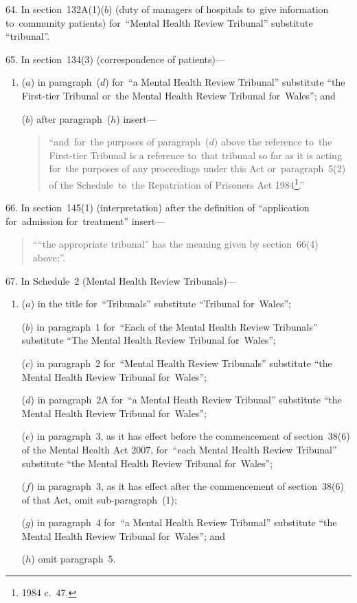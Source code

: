 \documentclass[12pt,a4paper]{article}
\begin{document}
\medskip

64.  In section~132A(1)($b$)  (duty of managers of hospitals to~give information to~community patients) for~“Mental Health Review Tribunal” substitute “tribunal”.

\medskip

65.  In section~134(3) (correspondence of patients)—
\begin{enumerate}\item[]
($a$) in paragraph~($d$)  for~“a Mental Health Review Tribunal” substitute “the First-tier Tribunal or~the Mental Health Review Tribunal for~Wales”; and

($b$) after paragraph~($h$)  insert—
\begin{quotation}
“and~for~the purposes of paragraph~($d$)  above the reference to~the First-tier Tribunal is a reference to~that tribunal so far as it is acting for~the purposes of any proceedings under this Act or~paragraph~5(2) of the Schedule~to~the Repatriation of Prisoners Act 1984\footnote{1984 c.~47.}.”
\end{quotation}
\end{enumerate}

\medskip

66.  In section~145(1) (interpretation) after the definition of “application for~admission for~treatment” insert—
\begin{quotation}
““the appropriate tribunal” has the meaning given by section~66(4) above;”.
\end{quotation}

\medskip

67.  In Schedule~2 (Mental Health Review Tribunals)—
\begin{enumerate}\item[]
($a$) in the title for~“Tribunals” substitute “Tribunal for~Wales”;

($b$) in paragraph~1 for~“Each of the Mental Health Review Tribunals” substitute “The Mental Health Review Tribunal for~Wales”;

($c$) in paragraph~2 for~“Mental Health Review Tribunals” substitute “the Mental Health Review Tribunal for~Wales”;

($d$) in paragraph~2A for~“a Mental Heath Review Tribunal” substitute “the Mental Health Review Tribunal for~Wales”;

($e$) in paragraph~3, as it has effect before the commencement of section~38(6) of the Mental Health Act 2007, for~“each Mental Health Review Tribunal” substitute “the Mental Health Review Tribunal for~Wales”;

($f$) in paragraph~3, as it has effect after the commencement of section~38(6) of that Act, omit sub-paragraph~(1);

($g$) in paragraph~4 for~“a Mental Health Review Tribunal” substitute “the Mental Health Review Tribunal for~Wales”; and

($h$) omit paragraph~5.
\end{enumerate}
\end{document}
